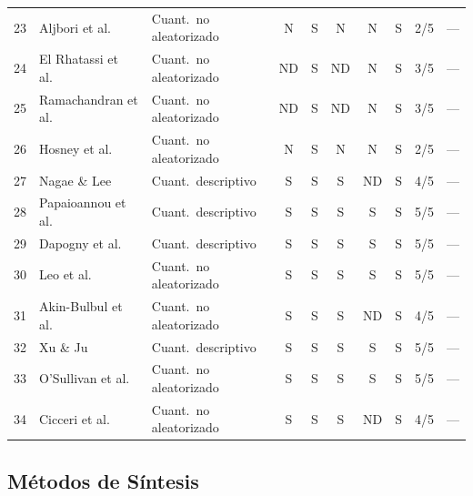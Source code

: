 \documentclass[3p,twocolumn,times]{elsarticle}
\begin{document}
\begin{longtable}{clp{3cm}ccccccl}
		23 & Aljbori et al.\ \cite{Aljbori2025}           & Cuant.\ no aleatorizado & N  & S  & N  & N  & S  & 2/5 & --- \\
		24 & El Rhatassi et al.\ \cite{Rhatassi2025}      & Cuant.\ no aleatorizado & ND & S  & ND & N  & S  & 3/5 & --- \\
		25 & Ramachandran et al.\ \cite{Ramachandran2025} & Cuant.\ no aleatorizado & ND & S  & ND & N  & S  & 3/5 & --- \\
		26 & Hosney et al.\ \cite{Hosney2024}             & Cuant.\ no aleatorizado & N  & S  & N  & N  & S  & 2/5 & --- \\
		27 & Nagae \& Lee \cite{Nagae2022}                & Cuant.\ descriptivo     & S  & S  & S  & ND & S  & 4/5 & --- \\
		28 & Papaioannou et al.\ \cite{Papaioannou2021}   & Cuant.\ descriptivo     & S  & S  & S  & S  & S  & 5/5 & --- \\
		29 & Dapogny et al.\ \cite{Dapogny2019}           & Cuant.\ descriptivo     & S  & S  & S  & S  & S  & 5/5 & --- \\
		30 & Leo et al.\ \cite{Leo2018}                   & Cuant.\ no aleatorizado & S  & S  & S  & S  & S  & 5/5 & --- \\
		31 & Akin-Bulbul et al.\ \cite{AkinBulbul2024}    & Cuant.\ no aleatorizado & S  & S  & S  & ND & S  & 4/5 & --- \\
		32 & Xu \& Ju \cite{Xu2023}                       & Cuant.\ descriptivo     & S  & S  & S  & S  & S  & 5/5 & --- \\
		33 & O'Sullivan et al.\ \cite{OSullivan2023}       & Cuant.\ no aleatorizado & S  & S  & S  & S  & S  & 5/5 & --- \\
		34 & Cicceri et al.\ \cite{Cicceri2026}            & Cuant.\ no aleatorizado & S  & S  & S  & ND & S  & 4/5 & --- \\
	\end{longtable}
	\twocolumn
	
	\subsection{Métodos de Síntesis}\label{sec2g}
	
\end{document}
